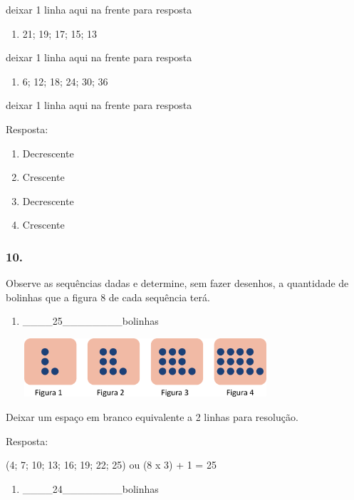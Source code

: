 deixar 1 linha aqui na frente para resposta

\begin{enumerate}
\def\labelenumi{\alph{enumi})}
\item
  21; 19; 17; 15; 13
\end{enumerate}

deixar 1 linha aqui na frente para resposta

\begin{enumerate}
\def\labelenumi{\alph{enumi})}
\item
  6; 12; 18; 24; 30; 36
\end{enumerate}

deixar 1 linha aqui na frente para resposta

Resposta:

\begin{enumerate}
\def\labelenumi{\alph{enumi})}
\item
  Decrescente
\item
  Crescente
\item
  Decrescente
\item
  Crescente
\end{enumerate}

\subsubsection{10.}\label{section-42}

Observe as sequências dadas e determine, sem fazer desenhos, a
quantidade de bolinhas que a figura 8 de cada sequência terá.

\begin{enumerate}
\def\labelenumi{\alph{enumi})}
\item
  \_\_\_\_25\_\_\_\_\_\_\_\_bolinhas
\end{enumerate}

\includegraphics[width=4.09202in,height=0.85841in]{media/image32.png}

Deixar um espaço em branco equivalente a 2 linhas para resolução.

Resposta:

(4; 7; 10; 13; 16; 19; 22; 25) ou (8 x 3) + 1 = 25

\begin{enumerate}
\def\labelenumi{\alph{enumi})}
\item
  \_\_\_\_24\_\_\_\_\_\_\_\_bolinhas
\end{enumerate}

